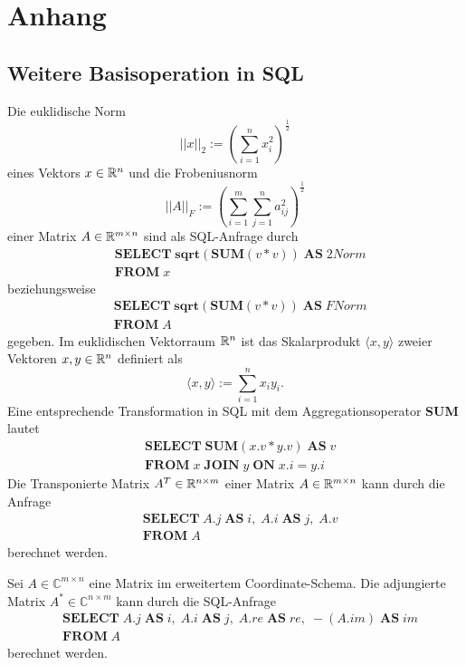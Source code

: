 \chapter{Anhang}

\section{Weitere Basisoperation in SQL}
\label{app:app_1}
Die euklidische Norm 
\begin{equation*}
    ||x||_{2}:=\left(\sum_{i=1}^n x_i^2\right)^{\frac{1}{2}}
\end{equation*}
eines Vektors $x \in \mathbb{R}^n$ und die Frobeniusnorm 
\begin{equation*}
    ||A||_F:=\left(\sum_{i=1}^m \sum_{j=1}^n a_{ij}^2\right)^{\frac{1}{2}} 
\end{equation*}
einer Matrix $A \in \mathbb{R}^{m \times n}$ sind als SQL-Anfrage durch
\begin{align*}
    & \mathbf{SELECT} \; \mathbf{sqrt}(\mathbf{SUM}(v*v)) \; \mathbf{AS} \; 2Norm \\
    & \mathbf{FROM} \; x
\end{align*}
beziehungsweise
\begin{align*}
    & \mathbf{SELECT} \; \mathbf{sqrt}(\mathbf{SUM}(v*v)) \; \mathbf{AS} \; FNorm \\
    & \mathbf{FROM} \; A
\end{align*}
gegeben.
Im euklidischen Vektorraum $\mathbb{R}^n$ ist das Skalarprodukt $\langle x,y \rangle$ zweier Vektoren $x,y \in \mathbb{R}^n$ definiert als 
\begin{equation*}
    \langle x,y \rangle :=\sum_{i=1}^n x_i y_i.
\end{equation*}
Eine entsprechende Transformation in SQL mit dem Aggregationsoperator \textbf{SUM} lautet
\begin{align*}
    & \mathbf{SELECT} \; \mathbf{SUM}(x.v*y.v) \; \mathbf{AS} \; v \\
    & \mathbf{FROM} \; x \; \mathbf{JOIN} \; y \; \mathbf{ON} \; x.i=y.i
\end{align*}
Die Transponierte Matrix $A^T \in \mathbb{R}^{n \times m}$ einer Matrix $A \in \mathbb{R}^{m \times n}$ kann durch die Anfrage 
\begin{align*}
    & \mathbf{SELECT} \; A.j \; \mathbf{AS} \; i, \; A.i \; \mathbf{AS} \; j, \; A.v\\
    & \mathbf{FROM} \; A
\end{align*}
berechnet werden.

Sei $A \in \mathbb{C}^{m \times n}$ eine Matrix im erweitertem Coordinate-Schema. Die adjungierte Matrix $A^* \in \mathbb{C}^{n \times m}$ kann durch die SQL-Anfrage
\begin{align*}
    & \mathbf{SELECT} \; A.j \; \mathbf{AS} \; i, \; A.i \; \mathbf{AS} \; j, \; A.re \;\mathbf{AS} \; re, \; -(A.im) \; \mathbf{AS} \; im  \\
    & \mathbf{FROM} \; A
\end{align*}
berechnet werden.
